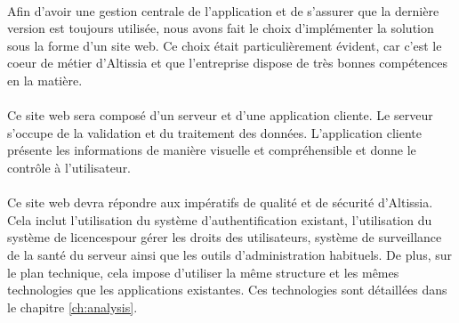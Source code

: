 \paragraph{}
Afin d'avoir une gestion centrale de l'application et de s'assurer que la dernière version est toujours utilisée, nous avons fait le choix d'implémenter la solution sous la forme d'un site web.
Ce choix était particulièrement évident, car c'est le coeur de métier d'Altissia et que l'entreprise dispose de très bonnes compétences en la matière.

\paragraph{}
Ce site web sera composé d'un serveur et d'une application cliente.
Le serveur s'occupe de la validation et du traitement des données.
L'application cliente présente les informations de manière visuelle et compréhensible et donne le contrôle à l'utilisateur.

\paragraph{}
Ce site web devra répondre aux impératifs de qualité et de sécurité d'Altissia.
Cela inclut l'utilisation du système d'authentification existant, l'utilisation du système de licences\fnmark pour gérer les droits des utilisateurs, système de surveillance de la santé du serveur ainsi que les outils d'administration habituels. %
De plus, sur le plan technique, cela impose d'utiliser la même structure et les mêmes technologies que les applications existantes.
Ces technologies sont détaillées dans le chapitre \ref{ch:analysis}.
